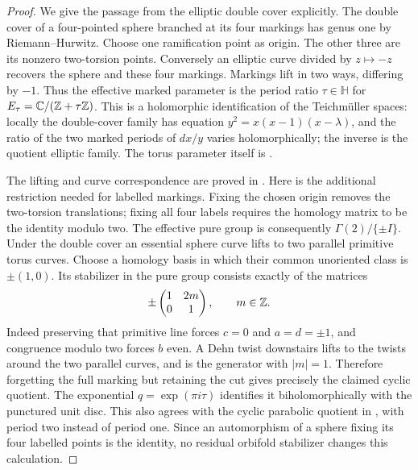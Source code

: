 \begin{proof}
We give the passage from the elliptic double cover explicitly.
The double cover of a four-pointed sphere branched at its four
markings has genus one by Riemann--Hurwitz. Choose one ramification
point as origin. The other three are its nonzero two-torsion
points. Conversely an elliptic curve divided by $z\mapsto-z$
recovers the sphere and these four markings. Markings lift in two
ways, differing by $-1$. Thus the effective marked parameter is
the period ratio $\tau\in\mathbb H$ for
$E_\tau={\mathbb{C}}/({\mathbb{Z}}+\tau{\ensuremath{\mathbb{Z}}})$. This is a holomorphic identification
of the Teichm\"uller spaces: locally the double-cover family has
equation $y^2=x(x-1)(x-\lambda)$, and the ratio of the two marked
periods of $dx/y$ varies holomorphically; the inverse is the
quotient elliptic family. The torus parameter itself is
\cite[Example 2.3, p.~12]{AHubbardKoch2014}.

The lifting and curve correspondence are proved in
\cite[Propositions 2.6--2.7, pp.~55--57]{FarbMargalit2012A567}.
Here is the additional restriction needed for labelled markings.
Fixing the chosen origin removes the two-torsion translations;
fixing all four labels requires the homology matrix to be the
identity modulo two. The effective pure group is consequently
$\Gamma(2)/\{\pm I\}$. Under the double cover an essential sphere
curve lifts to two parallel primitive torus curves. Choose a
homology basis in which their common unoriented class is
$\pm(1,0)$. Its stabilizer in the pure group consists exactly of
the matrices
\[
 \pm\begin{pmatrix}1&2m\\0&1\end{pmatrix},\qquad m\in{\ensuremath{\mathbb{Z}}}.
\]
Indeed preserving that primitive line forces $c=0$ and $a=d=\pm1$,
and congruence modulo two forces $b$ even. A Dehn twist downstairs
lifts to the twists around the two parallel curves, and is the
generator with $|m|=1$. Therefore forgetting the full marking but
retaining the cut gives precisely the claimed cyclic quotient.
The exponential $q=\exp(\pi i\tau)$ identifies it biholomorphically
with the punctured unit disc. This also agrees with the cyclic
parabolic quotient in \cite[Example 7.2, pp.~25--26]{AHubbardKoch2014},
with period two instead of period one. Since an automorphism of a
sphere fixing its four labelled points is the identity, no residual
orbifold stabilizer changes this calculation.


\end{proof}
